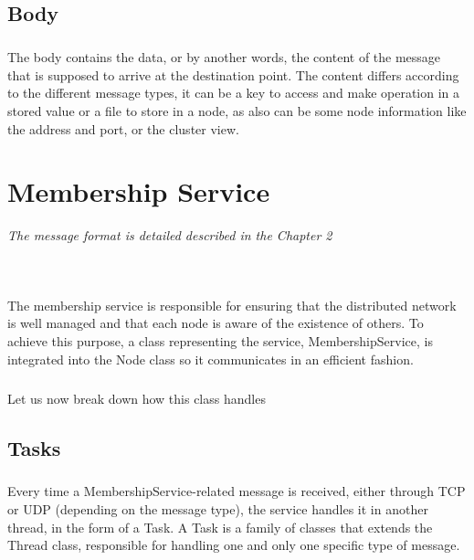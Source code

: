 \documentclass{report}
\begin{document}
			\section{Body}
	
				\paragraph{} The body contains the data, or by another words, the
				content of the message that is supposed to arrive at the destination point.
				The content differs according to the different message types, it
				can be a key to access and make operation in a stored value or a
				file to store in a node, as also can be some node information like the address
				and port, or the cluster view.

	\chapter{Membership Service}
			\emph{The message format is detailed described in the Chapter 2}
			
			\begin{lstlisting}[language=Java]
				
			\end{lstlisting}

	        \paragraph{} The membership service is responsible for ensuring that the distributed network is well managed and that each node is aware of the existence of others. To achieve this purpose, a class representing the service, MembershipService, is integrated into the Node class so it communicates in an efficient fashion.
	        
	        \paragraph{}Let us now break down how this class handles 
	        
	        \section{Tasks}
	        
	        	\paragraph{}Every time a MembershipService-related message is received, either through TCP or UDP (depending on the message type), the service handles it in another thread, in the form of a Task. A Task is a family of classes that extends the Thread class, responsible for handling one and only one specific type of message. 
	        	
\end{document}
